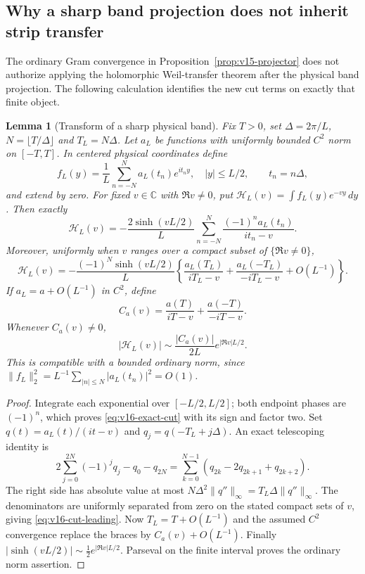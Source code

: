 \documentclass[11pt]{article}
\newtheorem{lemma}[theorem]{Lemma}
\theoremstyle{remark}
\begin{document}
\subsection*{Why a sharp band projection does not inherit strip transfer}
The ordinary Gram convergence in Proposition~\ref{prop:v15-projector}
does not authorize applying the holomorphic Weil-transfer theorem after
the physical band projection. The following calculation identifies the
new cut terms on exactly that finite object.

\begin{lemma}[Transform of a sharp physical band]\label{lem:v16-band-transform}
Fix $T>0$, set $\Delta=2\pi/L$, $N=\lfloor T/\Delta\rfloor$ and
$T_L=N\Delta$. Let $a_L$ be functions with uniformly bounded $C^2$
norm on $[-T,T]$. In centered physical coordinates define
\[
 f_L(y)=\frac1L\sum_{n=-N}^N a_L(t_n)e^{it_ny},\quad |y|\le L/2,
 \qquad t_n=n\Delta,
\]
and extend by zero. For fixed $v\in\mathbb C$ with $\Re v\ne0$, put
$\mathcal H_L(v)=\int f_L(y)e^{-vy}\,dy$. Then exactly
\begin{equation}\label{eq:v16-exact-cut}
 \mathcal H_L(v)=-\frac{2\sinh(vL/2)}L
       \sum_{n=-N}^N\frac{(-1)^n a_L(t_n)}{it_n-v}.
\end{equation}
Moreover, uniformly when $v$ ranges over a compact subset of
$\{\Re v\ne0\}$,
\begin{equation}\label{eq:v16-cut-leading}
 \mathcal H_L(v)=-\frac{(-1)^N\sinh(vL/2)}L
 \left\{\frac{a_L(T_L)}{iT_L-v}
       +\frac{a_L(-T_L)}{-iT_L-v}+O(L^{-1})\right\}.
\end{equation}
If $a_L=a+O(L^{-1})$ in $C^2$, define
\[
 C_a(v)=\frac{a(T)}{iT-v}+\frac{a(-T)}{-iT-v}.
\]
Whenever $C_a(v)\ne0$,
\begin{equation}\label{eq:v16-cut-growth}
 |\mathcal H_L(v)|\sim\frac{|C_a(v)|}{2L}
                  e^{|\Re v|L/2}.
\end{equation}
This is compatible with a bounded ordinary norm, since
$\|f_L\|_2^2=L^{-1}\sum_{|n|\le N}|a_L(t_n)|^2=O(1)$.
\end{lemma}
\begin{proof}
Integrate each exponential over $[-L/2,L/2]$; both endpoint phases
are $(-1)^n$, which proves \eqref{eq:v16-exact-cut} with its sign
and factor two. Set $q(t)=a_L(t)/(it-v)$ and
$q_j=q(-T_L+j\Delta)$. An exact telescoping identity is
\[
 2\sum_{j=0}^{2N}(-1)^j q_j-q_0-q_{2N}
 =\sum_{k=0}^{N-1}(q_{2k}-2q_{2k+1}+q_{2k+2}).
\]
The right side has absolute value at most
$N\Delta^2\|q''\|_\infty=T_L\Delta\|q''\|_\infty$.
The denominators are uniformly separated from zero on the stated compact
sets of $v$, giving \eqref{eq:v16-cut-leading}. Now
$T_L=T+O(L^{-1})$ and the assumed $C^2$ convergence replace the
braces by $C_a(v)+O(L^{-1})$. Finally
$|\sinh(vL/2)|\sim\tfrac12 e^{|\Re v|L/2}$. Parseval on the
finite interval proves the ordinary norm assertion.
\end{proof}
\end{document}
